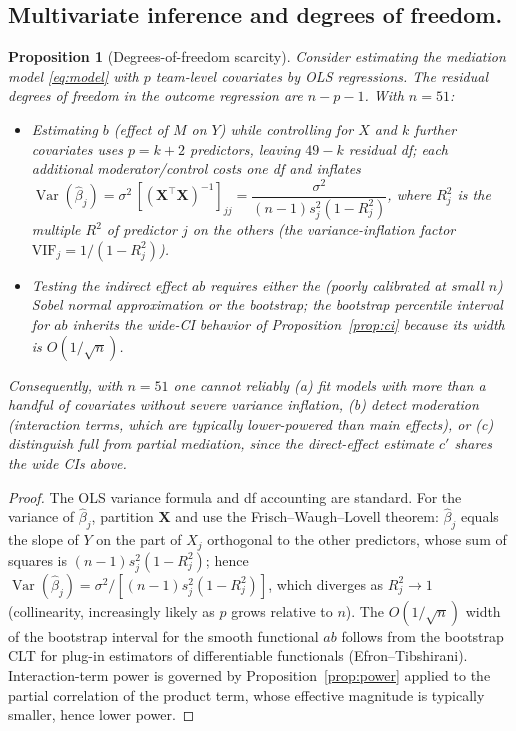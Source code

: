 \documentclass{amsart}
\newtheorem{proposition}{Proposition}
\theoremstyle{definition}
\begin{document}
\subsection*{Multivariate inference and degrees of freedom.}
\begin{proposition}[Degrees-of-freedom scarcity]\label{prop:df}
Consider estimating the mediation model \eqref{eq:model} with $p$
team-level covariates by OLS regressions. The residual degrees of freedom in
the outcome regression are $n-p-1$. With $n=51$:
\begin{itemize}
\item Estimating $b$ (effect of $M$ on $Y$) while controlling for $X$ and
$k$ further covariates uses $p=k+2$ predictors, leaving $49-k$ residual df;
each additional moderator/control costs one df and inflates
$\operatorname{Var}(\hat\beta_j)=\sigma^2\,[(\mathbf X^\top\mathbf X)^{-1}]_{jj}
=\dfrac{\sigma^2}{(n-1)s_j^2(1-R_j^2)}$, where $R_j^2$ is the multiple
$R^2$ of predictor $j$ on the others (the variance-inflation factor
$\mathrm{VIF}_j=1/(1-R_j^2)$).
\item Testing the indirect effect $ab$ requires either the (poorly
calibrated at small $n$) Sobel normal approximation or the bootstrap; the
bootstrap percentile interval for $ab$ inherits the wide-CI behavior of
Proposition~\ref{prop:ci} because its width is $O(1/\sqrt{n})$.
\end{itemize}
Consequently, with $n=51$ one cannot reliably (a) fit models with more than a
handful of covariates without severe variance inflation, (b) detect
moderation (interaction terms, which are typically lower-powered than main
effects), or (c) distinguish full from partial mediation, since the
direct-effect estimate $c'$ shares the wide CIs above.
\end{proposition}

\begin{proof}
The OLS variance formula and df accounting are standard. For the variance of
$\hat\beta_j$, partition $\mathbf X$ and use the Frisch--Waugh--Lovell
theorem: $\hat\beta_j$ equals the slope of $Y$ on the part of $X_j$ orthogonal
to the other predictors, whose sum of squares is $(n-1)s_j^2(1-R_j^2)$;
hence $\operatorname{Var}(\hat\beta_j)=\sigma^2/[(n-1)s_j^2(1-R_j^2)]$, which
diverges as $R_j^2\to1$ (collinearity, increasingly likely as $p$ grows
relative to $n$). The $O(1/\sqrt n)$ width of the bootstrap interval for the
smooth functional $ab$ follows from the bootstrap CLT for plug-in estimators
of differentiable functionals (Efron--Tibshirani). Interaction-term power is
governed by Proposition~\ref{prop:power} applied to the partial correlation
of the product term, whose effective magnitude is typically smaller, hence
lower power.
\end{proof}
\end{document}
